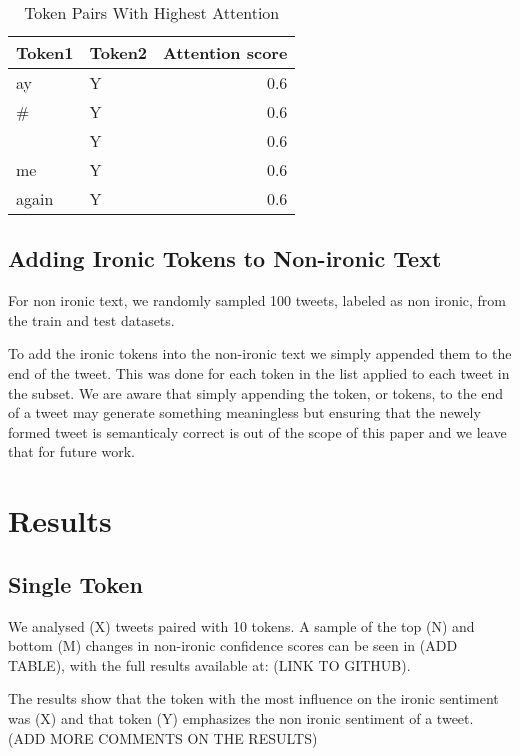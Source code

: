\documentclass[10pt, a4paper]{article}
\begin{document}
\begin{table*}
\caption{Token Pairs With Highest Attention}
\label{tab:attention-tokens-pairs}
\begin{center}
\begin{tabular}{llr}
\toprule
Token1 & Token2 & Attention score\\
\midrule
ay                  & Y & 0.6 \\
\#                  & Y & 0.6 \\
\textvisiblespace   & Y & 0.6 \\
me                  & Y & 0.6 \\
again               & Y & 0.6 \\
\bottomrule
\end{tabular}
\end{center}
\end{table*}

\subsection{Adding Ironic Tokens to Non-ironic Text}

For non ironic text, we randomly sampled 100 tweets, labeled as non ironic, from the train and test datasets.

To add the ironic tokens into the non-ironic text we simply appended them to the end of the tweet. This was done for each token in the list applied to each tweet in the subset.
We are aware that simply appending the token, or tokens, to the end of a tweet may generate something meaningless but ensuring that the newely formed tweet is semanticaly correct is out of the scope of this paper and we leave that for future work.

\section{Results}

\subsection{Single Token}

We analysed (X) tweets paired with 10 tokens. A sample of the top (N) and bottom (M) changes in non-ironic confidence scores can be seen in (ADD TABLE), with the full results available at: (LINK TO GITHUB).

The results show that the token with the most influence on the ironic sentiment was (X) and that token (Y) emphasizes the non ironic sentiment of a tweet. (ADD MORE COMMENTS ON THE RESULTS)
\end{document}
